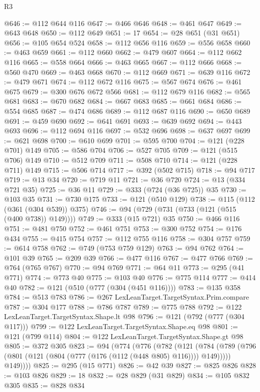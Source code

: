 \begin{lexlean}{R3}
\begin{coremodule}
{{{{{{{{{{{{{{{{{{{{{{{{{{{{{{{{{{{{{{{{{{{{{{{{{{{{{{{{{{{{{{{{{{{{{{{{{{{@646 := @112 @644 @116
@647 := @466 @646
@648 := @461 @647
@649 := @643 @648
@650 := @112 @649
@651 := 17
@654 := @28 @651 (@31 @651)
@656 := @105 @654 @524
@658 := @112 @656 @116
@659 := @556 @658
@660 := @463 @659
@661 := @112 @660
@662 := @479 @607
@664 := @112 @662 @116
@665 := @558 @664
@666 := @463 @665
@667 := @112 @666
@668 := @560 @470
@669 := @463 @668
@670 := @112 @669
@671 := @639 @116
@672 := @479 @671
@674 := @112 @672 @116
@675 := @567 @674
@676 := @461 @675
@679 := @300 @676 @672 @566
@681 := @112 @679 @116
@682 := @565 @681
@683 := @670 @682
@684 := @667 @683
@685 := @661 @684
@686 := @554 @685
@687 := @474 @686
@689 := @112 @687 @116
@690 := @650 @689
@691 := @459 @690
@692 := @641 @691
@693 := @639 @692
@694 := @443 @693
@696 := @112 @694 @116
@697 := @532 @696
@698 := @637 @697
@699 := @621 @698
@700 := @610 @699
@701 := @595 @700
@704 := @121 (@228 @701) @149
@705 := @586 @704
@706 := @527 @705
@709 := @121 (@515 @706) @149
@710 := @512 @709
@711 := @508 @710
@714 := @121 (@228 @711) @149
@715 := @506 @714
@717 := @392 (@502 @715)
@718 := @94 @717
@719 := @13 @34
@720 := @719 @11
@721 := @36 @720
@724 := @13 (@334 @721 @35)
@725 := @36 @11
@729 := @333 (@724 (@36 @725)) @35
@730 := @103 @35
@731 := @730 @175
@733 := @121 (@510 @129)
@738 := @115 (@112 (@361 (@304 @539)) @375)
@746 := @94 (@729 (@731 (@733 (@121 (@515 (@400 @738)) @149))))
@749 := @333 (@15 @721) @35
@750 := @466 @116
@751 := @481 @750
@752 := @461 @751
@753 := @300 @752
@754 := @176 @434
@755 := @415 @754
@757 := @112 @755 @116
@758 := @304 @757
@759 := @614 @758
@762 := @749 (@753 @759 @129)
@763 := @94 @762
@764 := @101 @39
@765 := @209 @39
@766 := @477 @116
@767 := @477 @766
@769 := @764 (@765 @767)
@770 := @94 @769
@771 := @64 @11
@773 := @295 (@41 @771)
@774 := @773 @40
@775 := @103 @40
@776 := @775 @114
@777 := @414 @40
@782 := @121 (@510 (@777 (@304 (@451 @116))))
@783 := @135 @358
@784 := @513 @783
@786 := @267 LexLeanTarget.TargetSyntax.Prim.compare
@787 := @304 @177
@788 := @786 @787
@789 := @775 @788
@792 := @122 LexLeanTarget.TargetSyntax.Shape.lt @98
@796 := @121 (@792 (@777 (@304 @117)))
@799 := @122 LexLeanTarget.TargetSyntax.Shape.eq @98
@801 := @121 (@799 @114)
@804 := @122 LexLeanTarget.TargetSyntax.Shape.gt @98
@805 := @372 @305
@823 := @94
    (@774
      (@776
        (@782
          (@121
            (@784 (@789 (@796 (@801 (@121 (@804 (@777 (@176 (@112 (@448 @805) @116)))) @149)))))
            @149))))
@825 := @295 (@15 @771)
@826 := @42 @39
@827 := @825 @826
@828 := @103 @826
@829 := 18
@832 := @28 @829 (@31 @829)
@834 := @105 @832 @305
@835 := @828 @834
}}}}}}}}}}}}}}}}}}}}}}}}}}}}}}}}}}}}}}}}}}}}}}}}}}}}}}}}}}}}}}}}}}}}}}}}}}}
\end{coremodule}
\end{lexlean}

